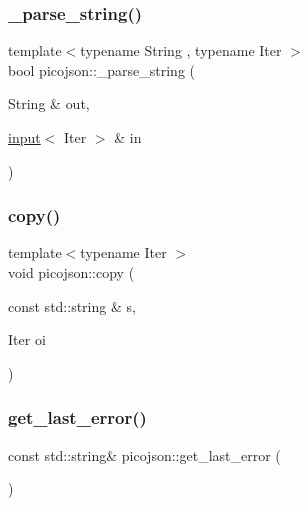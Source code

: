 \hypertarget{namespacepicojson_a9a1d94feb2718129796225d77c9e8d11}{}\label{namespacepicojson_a9a1d94feb2718129796225d77c9e8d11} 
\subsubsection{\texorpdfstring{\+\_\+parse\+\_\+string()}{\_parse\_string()}}
{\footnotesize\ttfamily template$<$typename String , typename Iter $>$ \\
bool picojson\+::\+\_\+parse\+\_\+string (\begin{DoxyParamCaption}\item[{String \&}]{out,  }\item[{\hyperlink{classpicojson_1_1input}{input}$<$ Iter $>$ \&}]{in }\end{DoxyParamCaption})\hspace{0.3cm}{\ttfamily [inline]}}

\hypertarget{namespacepicojson_abc2111aa71797805957a4296fdf9c66d}{}\label{namespacepicojson_abc2111aa71797805957a4296fdf9c66d} 
\subsubsection{\texorpdfstring{copy()}{copy()}}
{\footnotesize\ttfamily template$<$typename Iter $>$ \\
void picojson\+::copy (\begin{DoxyParamCaption}\item[{const std\+::string \&}]{s,  }\item[{Iter}]{oi }\end{DoxyParamCaption})}

\hypertarget{namespacepicojson_a1ba78f161e46341e0c2fd705ff8b0210}{}\label{namespacepicojson_a1ba78f161e46341e0c2fd705ff8b0210} 
\subsubsection{\texorpdfstring{get\+\_\+last\+\_\+error()}{get\_last\_error()}}
{\footnotesize\ttfamily const std\+::string\& picojson\+::get\+\_\+last\+\_\+error (\begin{DoxyParamCaption}{ }\end{DoxyParamCaption})\hspace{0.3cm}{\ttfamily [inline]}}

